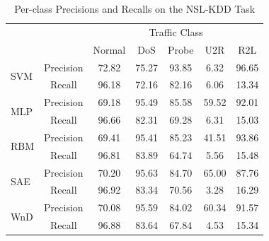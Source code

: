 \begin{table}[tbp]
    \centering
    \caption{Per-class Precisions and Recalls on the NSL-KDD Task}
    \label{CDL:Tab:PrecisionRecall}
    \begin{tabular}{lcccccc}
        \hline
        \hline
                             &            & \multicolumn{5}{c}{Traffic Class} \\
        \cline{3-7}
                             &            & Normal & DoS   & Probe & U2R   & R2L \\
        \hline
        \multirow{2}{*}{SVM} & Precision  & 72.82  & 75.27 & 93.85 &  6.32 & 96.65 \\
                             & Recall     & 96.18  & 72.16 & 82.16 &  6.06 & 13.34 \\
        \cline{1-2}
        \multirow{2}{*}{MLP} & Precision  & 69.18  & 95.49 & 85.58 & 59.52 & 92.01 \\
                             & Recall     & 96.66  & 82.31 & 69.28 &  6.31 & 15.03 \\
        \cline{1-2}
        \multirow{2}{*}{RBM} & Precision  & 69.41  & 95.41 & 85.23 & 41.51 & 93.86 \\
        \cline{2-2}
                             & Recall     & 96.81  & 83.89 & 64.74 &  5.56 & 15.48 \\
        \cline{1-2}
        \multirow{2}{*}{SAE} & Precision  & 70.20  & 95.63 & 84.70 & 65.00 & 87.76 \\
                             & Recall     & 96.92  & 83.34 & 70.56 &  3.28 & 16.29 \\
        \cline{1-2}
        \multirow{2}{*}{WnD} & Precision  & 70.08  & 95.59 & 84.02 & 60.34 & 91.57 \\
                             & Recall     & 96.88  & 83.64 & 67.84 &  4.53 & 15.34 \\
        \hline
    \end{tabular}
\end{table}

